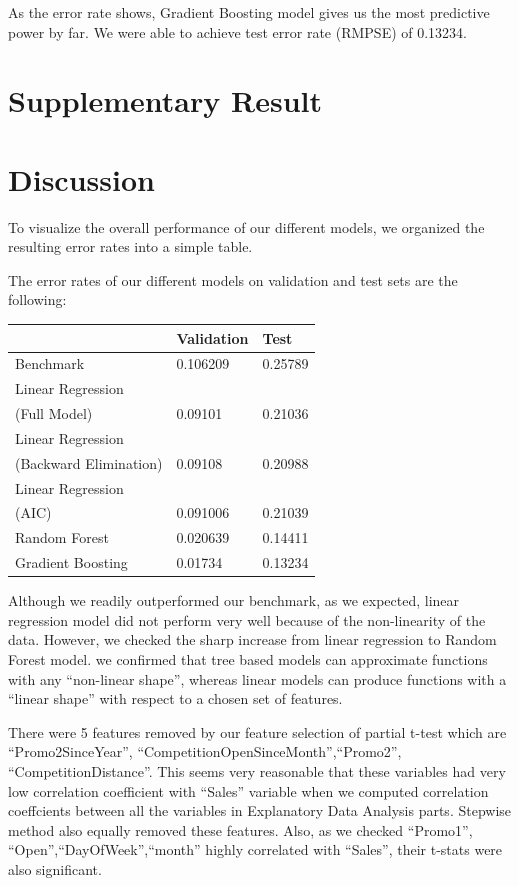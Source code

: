 \documentclass[letterpaper,twocolumn,11pt]{article}
\begin{document}
As the error rate shows, Gradient Boosting model gives us the most predictive power by far. We were able to achieve test error rate (RMPSE) of 0.13234.


\section{Supplementary Result}

\section{Discussion}
To visualize the overall performance of our different models, we organized the resulting error rates into a simple table. 

The error rates of our different models on validation and test sets are the following:

\begin{center}
    \begin{tabular}{| l | l | l |}
      \hline
       & Validation & Test \\ \hline
      Benchmark & 0.106209 & 0.25789  \\ \hline
      Linear Regression \\
      (Full Model) & 0.09101 & 0.21036 \\ \hline
      Linear Regression \\
      (Backward Elimination) & 0.09108 & 0.20988 \\ \hline
      Linear Regression \\
      (AIC) & 0.091006 & 0.21039 \\ \hline
      Random Forest & 0.020639 & 0.14411  \\ \hline
      Gradient Boosting & 0.01734 & 0.13234  \\ \hline
      \hline    
    \end{tabular}
\end{center}

    Although we readily outperformed our benchmark, as we expected, linear regression model did not perform very well because of the non-linearity of the data. However, we checked the sharp increase from linear regression to Random Forest model. we confirmed that tree based models can approximate functions with any ``non-linear shape'', whereas linear models can produce functions with a ``linear shape'' with respect to a chosen set of features. 

    There were 5 features removed by our feature selection of partial t-test which are ``Promo2SinceYear'', ``CompetitionOpenSinceMonth'',``Promo2'', ``CompetitionDistance''. This seems very reasonable that these variables had very low correlation coefficient with ``Sales'' variable when we computed correlation coeffcients between all the variables in Explanatory Data Analysis parts. Stepwise method also equally removed these features. Also, as we checked ``Promo1'', ``Open'',``DayOfWeek'',``month'' highly correlated with ``Sales'', their t-stats were also significant. 
\end{document}
